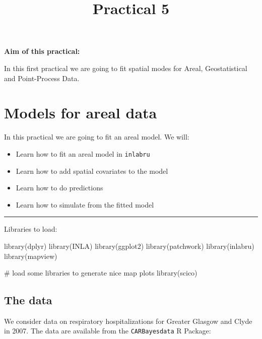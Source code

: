 \documentclass[
  letterpaper,
  DIV=11,
  numbers=noendperiod]{scrartcl}
\title{Practical 5}
\author{}
\date{}
\makeatletter
\newenvironment{Shaded}{\begin{snugshade}}{\end{snugshade}}
\newcommand{\CommentTok}[1]{\textcolor[rgb]{0.37,0.37,0.37}{#1}}
\newcommand{\FunctionTok}[1]{\textcolor[rgb]{0.28,0.35,0.67}{#1}}
\newcommand{\NormalTok}[1]{\textcolor[rgb]{0.00,0.23,0.31}{#1}}
\renewcommand{\maketitle}{\bgroup\setlength{\parindent}{0pt}
\begin{flushleft}
  {\sffamily\huge\textbf{\MakeUppercase{\@title}}} \vspace{0.3cm} \newline
  {\Large {\@subtitle}} \newline
  \@author
\end{flushleft}\egroup
}
\makeatother
\begin{document}
\maketitle

\pagestyle{mystyle}


\textbf{Aim of this practical:}

In this first practical we are going to fit spatial modes for Areal,
Geostatistical and Point-Process Data.

\section{Models for areal data}\label{models-for-areal-data}

In this practical we are going to fit an areal model. We will:

\begin{itemize}
\item
  Learn how to fit an areal model in \texttt{inlabru}
\item
  Learn how to add spatial covariates to the model
\item
  Learn how to do predictions
\item
  Learn how to simulate from the fitted model
\end{itemize}

\begin{center}\rule{0.5\linewidth}{0.5pt}\end{center}

Libraries to load:

\begin{Shaded}
\begin{Highlighting}[]
\FunctionTok{library}\NormalTok{(dplyr)}
\FunctionTok{library}\NormalTok{(INLA)}
\FunctionTok{library}\NormalTok{(ggplot2)}
\FunctionTok{library}\NormalTok{(patchwork)}
\FunctionTok{library}\NormalTok{(inlabru)   }
\FunctionTok{library}\NormalTok{(mapview)}

\CommentTok{\# load some libraries to generate nice map plots}
\FunctionTok{library}\NormalTok{(scico)}
\end{Highlighting}
\end{Shaded}

\subsection{The data}\label{the-data}

We consider data on respiratory hospitalizations for Greater Glasgow and
Clyde in 2007. The data are available from the \texttt{CARBayesdata} R
Package:
\end{document}
